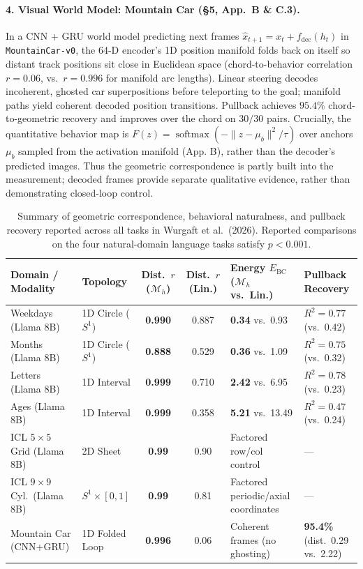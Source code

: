 \documentclass[10pt,a4paper]{article}
\newcommand{\Mh}{\mathcal{M}_h}
\begin{document}
\paragraph{4. Visual World Model: Mountain Car (\S5, App.\ B \& C.3).}
In a CNN + GRU world model predicting next frames $\hat{x}_{t+1} = x_t + f_{\mathrm{dec}}(h_t)$ in \texttt{MountainCar-v0}, the 64-D encoder's 1D position manifold folds back on itself so distant track positions sit close in Euclidean space (chord-to-behavior correlation $r = 0.06$, vs.\ $r = 0.996$ for manifold arc lengths). Linear steering decodes incoherent, ghosted car superpositions before teleporting to the goal; manifold paths yield coherent decoded position transitions. Pullback achieves $95.4\%$ chord-to-geometric recovery and improves over the chord on $30/30$ pairs. Crucially, the quantitative behavior map is $F(z)=\operatorname{softmax}(-\|z-\mu_b\|^2/\tau)$ over anchors $\mu_b$ sampled from the activation manifold (App. B), rather than the decoder's predicted images. Thus the geometric correspondence is partly built into the measurement; decoded frames provide separate qualitative evidence, rather than demonstrating closed-loop control.

\begin{table}[ht!]
\centering
\footnotesize
\setlength{\tabcolsep}{4pt}
\renewcommand{\arraystretch}{1.15}
\begin{tabularx}{\textwidth}{@{}l l c c Y Y@{}}
\toprule
\textbf{Domain / Modality} & \textbf{Topology} & \textbf{Dist.\ $r$ ($\Mh$)} & \textbf{Dist.\ $r$ (Lin.)} & \textbf{Energy $E_{\mathrm{BC}}$ ($\Mh$ vs.\ Lin.)} & \textbf{Pullback Recovery} \\
\midrule
Weekdays (Llama 8B) & 1D Circle ($S^1$) & \textbf{0.990} & 0.887 & \textbf{0.34} vs.\ 0.93 & $R^2 = \mathbf{0.77}$ (vs.\ 0.42) \\
Months (Llama 8B) & 1D Circle ($S^1$) & \textbf{0.888} & 0.529 & \textbf{0.36} vs.\ 1.09 & $R^2 = \mathbf{0.75}$ (vs.\ 0.32) \\
Letters (Llama 8B) & 1D Interval & \textbf{0.999} & 0.710 & \textbf{2.42} vs.\ 6.95 & $R^2 = \mathbf{0.78}$ (vs.\ 0.23) \\
Ages (Llama 8B) & 1D Interval & \textbf{0.999} & 0.358 & \textbf{5.21} vs.\ 13.49 & $R^2 = \mathbf{0.47}$ (vs.\ 0.24) \\
ICL $5\times 5$ Grid (Llama 8B) & 2D Sheet & \textbf{0.99} & 0.90 & Factored row/col control & --- \\
ICL $9\times 9$ Cyl.\ (Llama 8B) & $S^1 \times [0,1]$ & \textbf{0.99} & 0.81 & Factored periodic/axial coordinates & --- \\
Mountain Car (CNN+GRU) & 1D Folded Loop & \textbf{0.996} & 0.06 & Coherent frames (no ghosting) & \textbf{95.4\%} (dist.\ 0.29 vs.\ 2.22) \\
\bottomrule
\end{tabularx}
\caption{Summary of geometric correspondence, behavioral naturalness, and pullback recovery reported across all tasks in Wurgaft et al.\ (2026). Reported comparisons on the four natural-domain language tasks satisfy $p < 0.001$.}
\label{tab:results}
\end{table}
\end{document}
